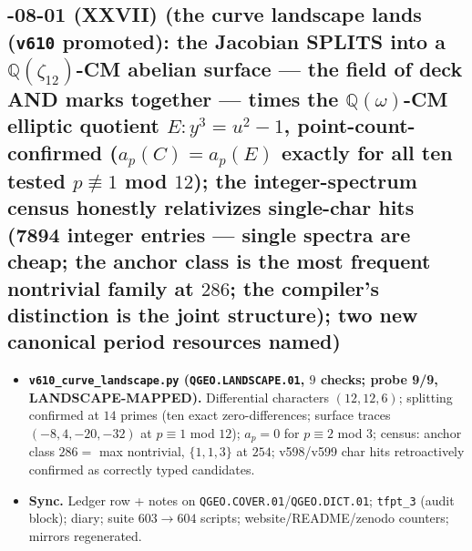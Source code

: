 \subsection*{-08-01 (XXVII) (the curve landscape lands (\texttt{v610} promoted): the Jacobian SPLITS into a $\mathbb{Q}(\zeta_{12})$-CM abelian surface --- the field of deck AND marks together --- times the $\mathbb{Q}(\omega)$-CM elliptic quotient $E: y^3=u^2-1$, point-count-confirmed ($a_p(C)=a_p(E)$ exactly for all ten tested $p\not\equiv1$ mod $12$); the integer-spectrum census honestly relativizes single-char hits (7894 integer entries --- single spectra are cheap; the anchor class is the most frequent nontrivial family at $286$; the compiler's distinction is the joint structure); two new canonical period resources named)}
\begin{itemize}[leftmargin=1.5em]
\item \textbf{\texttt{v610\_curve\_landscape.py} (\texttt{QGEO.LANDSCAPE.01}, $9$ checks; probe
9/9, LANDSCAPE-MAPPED).} Differential characters $(12,12,6)$; splitting confirmed at $14$
primes (ten exact zero-differences; surface traces $(-8,4,-20,-32)$ at $p\equiv1$ mod $12$);
$a_p=0$ for $p\equiv2$ mod $3$; census: anchor class $286=$ max nontrivial, $\{1,1,3\}$ at
$254$; v598/v599 char hits retroactively confirmed as correctly typed candidates.
\item \textbf{Sync.} Ledger row + notes on \texttt{QGEO.COVER.01}/\texttt{QGEO.DICT.01};
\texttt{tfpt\_3} (audit block); diary; suite $603\to604$ scripts; website/README/zenodo
counters; mirrors regenerated.
\end{itemize}

